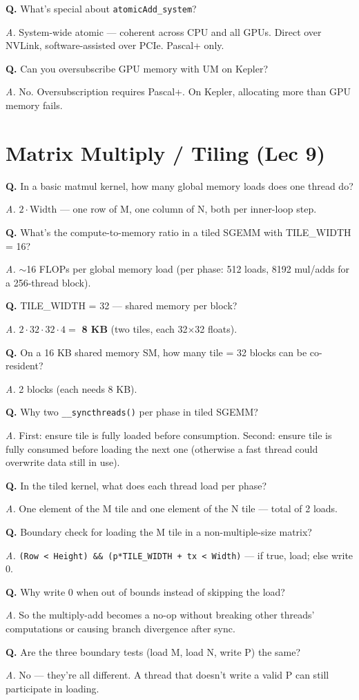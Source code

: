 \documentclass[10pt]{article}
\newcommand{\q}[1]{\par\vspace{6pt}\noindent\textbf{Q.} #1}
\newcommand{\ans}[1]{\par\noindent\textit{A.} #1\par}
\begin{document}
\q{What's special about \texttt{atomicAdd\_system}?}
\ans{System-wide atomic — coherent across CPU and all GPUs. Direct over NVLink, software-assisted over PCIe. Pascal+ only.}

\q{Can you oversubscribe GPU memory with UM on Kepler?}
\ans{No. Oversubscription requires Pascal+. On Kepler, allocating more than GPU memory fails.}

\hrulefill

\section*{Matrix Multiply / Tiling (Lec 9)}

\q{In a basic matmul kernel, how many global memory loads does one thread do?}
\ans{$2 \cdot \text{Width}$ — one row of M, one column of N, both per inner-loop step.}

\q{What's the compute-to-memory ratio in a tiled SGEMM with TILE\_WIDTH = 16?}
\ans{$\sim$16 FLOPs per global memory load (per phase: 512 loads, 8192 mul/adds for a 256-thread block).}

\q{TILE\_WIDTH = 32 — shared memory per block?}
\ans{$2 \cdot 32 \cdot 32 \cdot 4 = $ \textbf{8 KB} (two tiles, each 32$\times$32 floats).}

\q{On a 16 KB shared memory SM, how many tile = 32 blocks can be co-resident?}
\ans{2 blocks (each needs 8 KB).}

\q{Why two \texttt{\_\_syncthreads()} per phase in tiled SGEMM?}
\ans{First: ensure tile is fully loaded before consumption. Second: ensure tile is fully consumed before loading the next one (otherwise a fast thread could overwrite data still in use).}

\q{In the tiled kernel, what does each thread load per phase?}
\ans{One element of the M tile and one element of the N tile — total of 2 loads.}

\q{Boundary check for loading the M tile in a non-multiple-size matrix?}
\ans{\texttt{(Row < Height) \&\& (p*TILE\_WIDTH + tx < Width)} — if true, load; else write 0.}

\q{Why write 0 when out of bounds instead of skipping the load?}
\ans{So the multiply-add becomes a no-op without breaking other threads' computations or causing branch divergence after sync.}

\q{Are the three boundary tests (load M, load N, write P) the same?}
\ans{No — they're all different. A thread that doesn't write a valid P can still participate in loading.}
\end{document}
